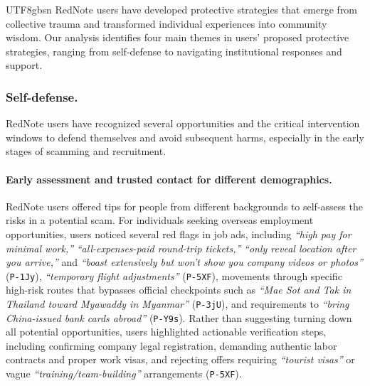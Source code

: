 \documentclass[sigconf,nonacm]{acmart}
\newcommand{\rev}[1]{#1}
\begin{document}
\begin{CJK}{UTF8}{gbsn}
RedNote users have developed protective strategies that emerge from collective trauma and transformed individual experiences into community wisdom. Our analysis identifies four main themes in users' proposed protective strategies, ranging from self-defense to navigating institutional responses and support.

\subsubsection{Self-defense.}
\label{sec:self_defense}

RedNote users have recognized several opportunities and the critical intervention windows to defend themselves and avoid subsequent harms, especially in the early stages of scamming and recruitment.

\paragraph{\textbf{\rev{Early assessment and trusted contact for different demographics.}}} RedNote users offered tips for people from different backgrounds to self-assess the risks in a potential scam. For individuals seeking overseas employment opportunities, users noticed several red flags in job ads, including \textit{``high pay for minimal work,''} \textit{``all-expenses-paid round-trip tickets,''} \textit{``only reveal location after you arrive,''} and \textit{``boast extensively but won't show you company videos or photos''} (\texttt{P-1Jy}), \textit{``temporary flight adjustments''} (\texttt{P-5XF}), movements through specific high-risk routes that bypasses official checkpoints such as \textit{``Mae Sot and Tak in Thailand toward Myawaddy in Myanmar''} (\texttt{P-3jU}), and requirements to \textit{``bring China-issued bank cards abroad''} (\texttt{P-Y9s}). Rather than suggesting turning down all potential opportunities, users highlighted actionable verification steps, including confirming company legal registration, demanding authentic labor contracts and proper work visas, and rejecting offers requiring \textit{``tourist visas''} or vague \textit{``training/team-building''} arrangements (\texttt{P-5XF}).


\end{CJK}
\end{document}
